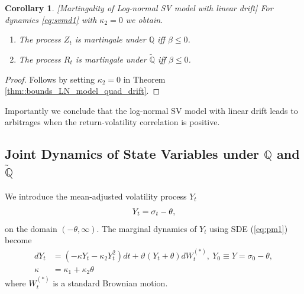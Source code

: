 \documentclass[pdftex,11pt,a4paper] {article}
\newtheorem{corollary}{Corollary}[section]
\begin{document}
\begin{corollary}\label{prop::bounds_LN_model_lin_drift}[Martingality of Log-normal SV model with linear drift]
For dynamics \eqref{eq:svmd1} with $\kappa_2=0$ we obtain.
\begin{enumerate}%
\item The process $Z_t$ is martingale under $\mathbb{Q}$ iff $\beta\le 0$.
\item The process $R_t$ is martingale under $\tilde{\mathbb{Q}}$ iff $\beta \le 0$.
\end{enumerate} 
\end{corollary}

\begin{proof}
Follows by setting $\kappa_2=0$ in Theorem \ref{thm::bounds_LN_model_quad_drift}.
\end{proof}

Importantly we conclude  that the log-normal SV model with linear drift leads to arbitrages when the return-volatility correlation is positive.



\subsection{Joint Dynamics of State Variables under $\mathbb{Q}$ and $\tilde{\mathbb{Q}}$}

We introduce the mean-adjusted volatility process $Y_t$
\begin{equation} \label{eq:tr2}
\begin{split}
Y_{t} = \sigma_{t}  - \theta,\vspace*{-1.0\baselineskip}
\end{split}
\end{equation}
on the domain $(-\theta, \infty)$. The marginal dynamics of $Y_{t}$ using SDE (\ref{eq:pm1}) become
\begin{equation} \label {eq:vd2}
\begin{split}
dY_{t}& =  \left(- \kappa Y_{t}   - \kappa_{2}Y^{2}_{t}\right)dt+ \vartheta \left(Y_{t}+\theta\right) dW^{(*)}_{t}, \ Y_{0} \equiv Y =\sigma_{0} - \theta,\\
\kappa&=\kappa_1+\kappa_2\theta
\end{split}
\end{equation}
where $W^{(*)}_{t}$ is a standard Brownian motion. 
\end{document}
